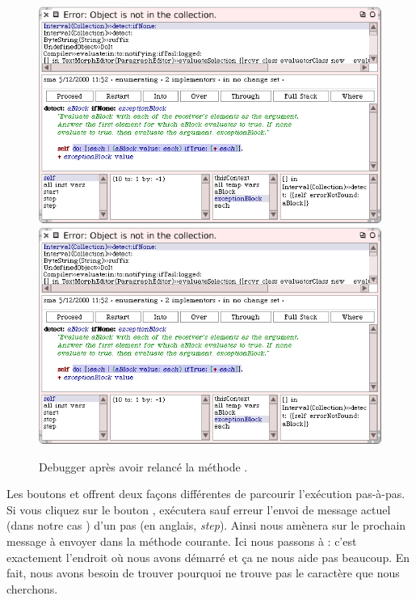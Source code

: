 \documentclass[a4paper,10pt,twoside]{book}
\begin{document}
\begin{figure}[btp]
	\begin{center}
	\ifluluelse
		{\includegraphics[width=\textwidth]{RestartDetectIfNone}}
		{\includegraphics[scale=0.7]{RestartDetectIfNone}}
	\end{center}
	\caption{Debugger apr\`es avoir relanc\'e la m\'ethode .}
	\label{fig:RestartDetectIfNone}
\end{figure}

Les boutons  et  offrent deux fa\c{c}ons diff\'erentes de parcourir l'ex\'ecution pas-\`a-pas.
Si vous cliquez sur le bouton , \sq ex\'ecutera sauf erreur
l'envoi de message actuel (dans notre cas ) d'un pas (en anglais, \emph{step}).
Ainsi  nous am\`enera sur 
le prochain message \`a envoyer dans la m\'ethode courante. Ici nous
passons \`a : c'est exactement l'endroit o\`u nous avons d\'emarr\'e
et \c{c}a ne nous aide pas beaucoup.
En fait, nous avons besoin de trouver pourquoi  ne trouve pas
le caract\`ere que nous cherchons.
\end{document}

